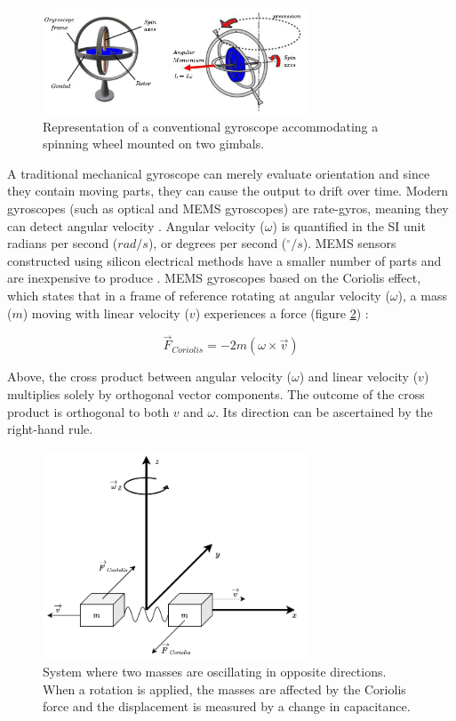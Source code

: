 \begin{figure}[!h]
  \centering
  \includegraphics[width=0.7\textwidth]{figures/gyroscope.pdf}
  \caption{ Representation of a conventional gyroscope accommodating a spinning wheel mounted on two gimbals. \cite{marotto2013orientation} }
  \label{fig:gyroscope}
\end{figure}

A traditional mechanical gyroscope can merely evaluate orientation and since they contain moving parts, they can cause the output to drift over time. Modern gyroscopes (such as optical and MEMS gyroscopes) are rate-gyros, meaning they can detect angular velocity \cite{antonello2011mems}. Angular velocity ($\omega$) is quantified in the SI unit radians per second ($rad/s$), or degrees per second ($^{\circ}/s$). MEMS sensors constructed using silicon electrical methods have a smaller number of parts and are inexpensive to produce \cite{antonello2012exploring}. MEMS gyroscopes based on the Coriolis effect, which states that in a frame of reference rotating at angular velocity ($\omega$), a mass ($m$) moving with linear velocity ($v$) experiences a force (figure \ref{fig:coriolis}) \cite{trusov2011overview}:

\begin{equation}
  \overrightarrow{F}_{Coriolis} = -2m(\omega \times \overrightarrow{v} )
\end{equation}

Above, the cross product between angular velocity ($\omega$) and linear velocity ($v$) multiplies solely by orthogonal vector components. The outcome of the cross product is orthogonal to both $v$ and $\omega$. Its direction can be ascertained by the right-hand rule.

\begin{figure}[!h]
  \centering
  \includegraphics[width=0.7\textwidth]{figures/coriolis.pdf}
  \caption{ System where two masses are oscillating in opposite directions. When a rotation is applied, the masses are affected by the Coriolis force and the displacement is measured by a change in capacitance. \cite{passaro2017gyroscope}}
  \label{fig:coriolis}
\end{figure}

